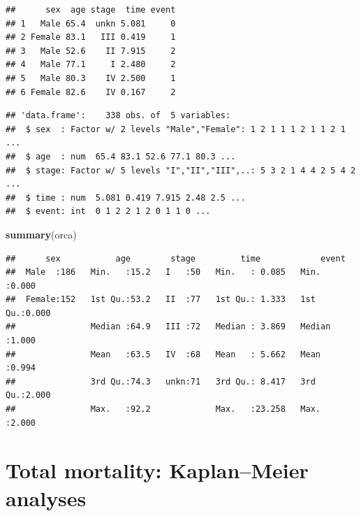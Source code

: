 \documentclass[
]{book}
\newenvironment{Shaded}{\begin{snugshade}}{\end{snugshade}}
\newcommand{\AttributeTok}[1]{\textcolor[rgb]{0.13,0.29,0.53}{#1}}
\newcommand{\FunctionTok}[1]{\textcolor[rgb]{0.13,0.29,0.53}{\textbf{#1}}}
\newcommand{\NormalTok}[1]{#1}
\newcommand{\OtherTok}[1]{\textcolor[rgb]{0.56,0.35,0.01}{#1}}
\newcommand{\SpecialCharTok}[1]{\textcolor[rgb]{0.81,0.36,0.00}{\textbf{#1}}}
\newcommand{\StringTok}[1]{\textcolor[rgb]{0.31,0.60,0.02}{#1}}
\theoremstyle{definition}
\theoremstyle{definition}
\theoremstyle{definition}
\theoremstyle{definition}
\theoremstyle{remark}
\begin{document}
\begin{verbatim}
##      sex  age stage  time event
## 1   Male 65.4  unkn 5.081     0
## 2 Female 83.1   III 0.419     1
## 3   Male 52.6    II 7.915     2
## 4   Male 77.1     I 2.480     2
## 5   Male 80.3    IV 2.500     1
## 6 Female 82.6    IV 0.167     2
\end{verbatim}

\begin{Shaded}
\end{Shaded}

\begin{verbatim}
## 'data.frame':    338 obs. of  5 variables:
##  $ sex  : Factor w/ 2 levels "Male","Female": 1 2 1 1 1 2 1 1 2 1 ...
##  $ age  : num  65.4 83.1 52.6 77.1 80.3 ...
##  $ stage: Factor w/ 5 levels "I","II","III",..: 5 3 2 1 4 4 2 5 4 2 ...
##  $ time : num  5.081 0.419 7.915 2.48 2.5 ...
##  $ event: int  0 1 2 2 1 2 0 1 1 0 ...
\end{verbatim}

\begin{Shaded}
\begin{Highlighting}[]
\FunctionTok{summary}\NormalTok{(orca)}
\end{Highlighting}
\end{Shaded}

\begin{verbatim}
##      sex           age        stage         time            event      
##  Male  :186   Min.   :15.2   I   :50   Min.   : 0.085   Min.   :0.000  
##  Female:152   1st Qu.:53.2   II  :77   1st Qu.: 1.333   1st Qu.:0.000  
##               Median :64.9   III :72   Median : 3.869   Median :1.000  
##               Mean   :63.5   IV  :68   Mean   : 5.662   Mean   :0.994  
##               3rd Qu.:74.3   unkn:71   3rd Qu.: 8.417   3rd Qu.:2.000  
##               Max.   :92.2             Max.   :23.258   Max.   :2.000
\end{verbatim}

\section{Total mortality: Kaplan--Meier analyses}\label{total-mortality-kaplanmeier-analyses}
\end{document}
